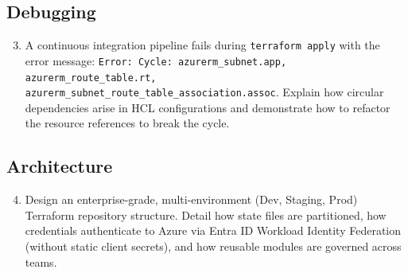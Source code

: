 \subsection{Debugging}
\begin{enumerate}[leftmargin=18pt]
  \setcounter{enumi}{2}
  \item A continuous integration pipeline fails during \texttt{terraform apply} with the error message: \texttt{Error: Cycle: azurerm\_subnet.app, azurerm\_route\_table.rt, azurerm\_subnet\_route\_table\_association.assoc}. Explain how circular dependencies arise in HCL configurations and demonstrate how to refactor the resource references to break the cycle.
\end{enumerate}

\subsection{Architecture}
\begin{enumerate}[leftmargin=18pt]
  \setcounter{enumi}{3}
  \item Design an enterprise-grade, multi-environment (Dev, Staging, Prod) Terraform repository structure. Detail how state files are partitioned, how credentials authenticate to Azure via Entra ID Workload Identity Federation (without static client secrets), and how reusable modules are governed across teams.
\end{enumerate}

